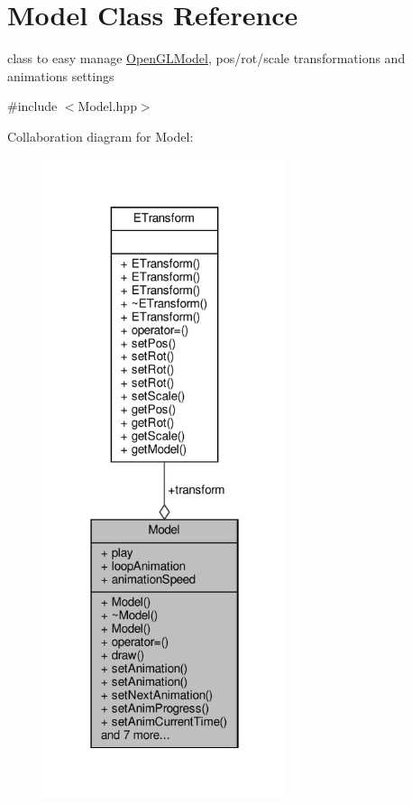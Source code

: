 \hypertarget{class_model}{}\section{Model Class Reference}
\label{class_model}


class to easy manage \hyperlink{class_open_g_l_model}{Open\+G\+L\+Model}, pos/rot/scale transformations and animations settings  




{\ttfamily \#include $<$Model.\+hpp$>$}



Collaboration diagram for Model\+:
\nopagebreak
\begin{figure}[H]
\begin{center}
\leavevmode
\includegraphics[width=202pt]{class_model__coll__graph}
\end{center}
\end{figure}

